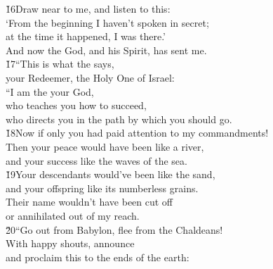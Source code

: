 \begin{poetry}
\poeml \v{16}Draw near to me, and listen to this: \\
\poemll    `From the beginning I haven't spoken in secret; \\
\poeml at the time it happened, I was there.' \\
\poemll    And now the  God, and his Spirit, has sent me. \\
\poeml \v{17}``This is what the  says, \\
\poemll    your Redeemer, the Holy One of Israel: \\
\poeml ``I am the  your God, \\
\poemll    who teaches you how to succeed, \\
\poemlll       who directs you in the path by which you should go. \\
\poeml \v{18}Now if only you had paid attention to my commandments! \\
\poemll    Then your peace would have been like a river, \\
\poemlll       and your success like the waves of the sea. \\
\poeml \v{19}Your descendants would've been like the sand, \\
\poemll    and your offspring like its numberless grains. \\
\poeml Their name wouldn't have been cut off \\
\poemll    or annihilated out of my reach. \\
\poeml \v{20}``Go out from Babylon, flee from the Chaldeans! \\
\poemll    With happy shouts, announce \\
\poeml and proclaim this to the ends of the earth: \\

\end{poetry}
